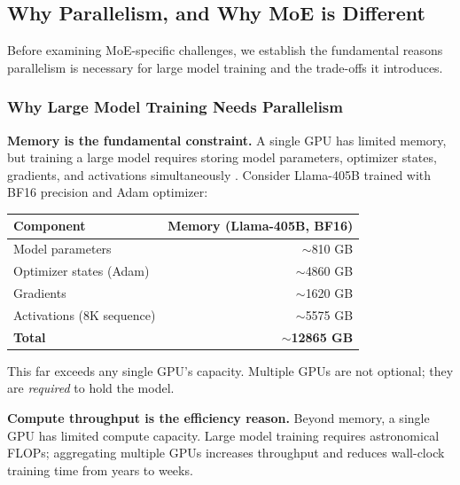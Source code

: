 \subsection{Why Parallelism, and Why MoE is Different}\label{sec:why-parallelism}

Before examining MoE-specific challenges, we establish the fundamental reasons parallelism is necessary for large model training and the trade-offs it introduces.

\subsubsection{Why Large Model Training Needs Parallelism}

\textbf{Memory is the fundamental constraint.} A single GPU has limited memory, but training a large model requires storing model parameters, optimizer states, gradients, and activations simultaneously \cite{rasley2020deepspeed}. Consider Llama-405B \cite{grattafiori2024llama3herdmodels,touvron2023llama,touvron2023llama2} trained with BF16 precision and Adam optimizer:

\begin{center}
\begin{tabular}{lr}
\toprule
\textbf{Component} & \textbf{Memory (Llama-405B, BF16)} \\
\midrule
Model parameters & $\sim$810 GB \\
Optimizer states (Adam) & $\sim$4860 GB \\
Gradients & $\sim$1620 GB \\
Activations (8K sequence) & $\sim$5575 GB \\
\midrule
\textbf{Total} & \textbf{$\sim$12865 GB} \\
\bottomrule
\end{tabular}
\end{center}

This far exceeds any single GPU's capacity. Multiple GPUs are not optional; they are \emph{required} to hold the model.

\textbf{Compute throughput is the efficiency reason.} Beyond memory, a single GPU has limited compute capacity. Large model training requires astronomical FLOPs; aggregating multiple GPUs increases throughput and reduces wall-clock training time from years to weeks.

